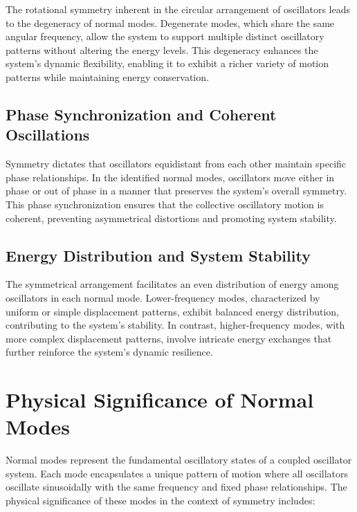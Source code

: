 \documentclass[12pt]{report} %
\begin{document}
The rotational symmetry inherent in the circular arrangement of oscillators leads to the degeneracy of normal modes. Degenerate modes, which share the same angular frequency, allow the system to support multiple distinct oscillatory patterns without altering the energy levels. This degeneracy enhances the system's dynamic flexibility, enabling it to exhibit a richer variety of motion patterns while maintaining energy conservation.

\subsection{Phase Synchronization and Coherent Oscillations}
\label{subsec:conclusion_phase_synchronization}

Symmetry dictates that oscillators equidistant from each other maintain specific phase relationships. In the identified normal modes, oscillators move either in phase or out of phase in a manner that preserves the system's overall symmetry. This phase synchronization ensures that the collective oscillatory motion is coherent, preventing asymmetrical distortions and promoting system stability.

\subsection{Energy Distribution and System Stability}
\label{subsec:conclusion_energy_distribution}

The symmetrical arrangement facilitates an even distribution of energy among oscillators in each normal mode. Lower-frequency modes, characterized by uniform or simple displacement patterns, exhibit balanced energy distribution, contributing to the system's stability. In contrast, higher-frequency modes, with more complex displacement patterns, involve intricate energy exchanges that further reinforce the system's dynamic resilience.

\section{Physical Significance of Normal Modes}
\label{sec:conclusion_physical_significance}

Normal modes represent the fundamental oscillatory states of a coupled oscillator system. Each mode encapsulates a unique pattern of motion where all oscillators oscillate sinusoidally with the same frequency and fixed phase relationships. The physical significance of these modes in the context of symmetry includes:
\end{document}
